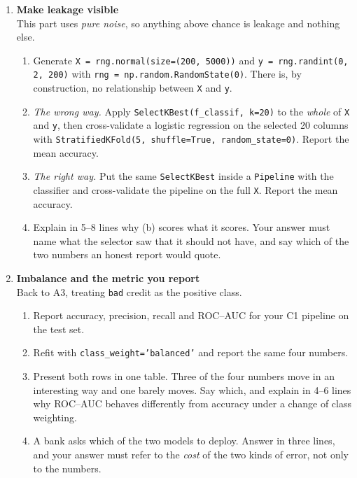 \documentclass[11pt,a4paper]{article}
\begin{document}
\begin{enumerate}[label=\textbf{C\arabic*.}, leftmargin=*]
  \item \textbf{Make leakage visible} \\
    This part uses \emph{pure noise}, so anything above chance is leakage and
    nothing else.
    \begin{enumerate}[label=(\alph*), leftmargin=*]
      \item Generate \texttt{X = rng.normal(size=(200, 5000))} and
        \texttt{y = rng.randint(0, 2, 200)} with
        \texttt{rng = np.random.RandomState(0)}. There is, by construction, no
        relationship between \texttt{X} and \texttt{y}.
      \item \emph{The wrong way.} Apply \texttt{SelectKBest(f\_classif, k=20)}
        to the \emph{whole} of \texttt{X} and \texttt{y}, then cross-validate a
        logistic regression on the selected 20 columns with
        \texttt{StratifiedKFold(5, shuffle=True, random\_state=0)}. Report the
        mean accuracy.
      \item \emph{The right way.} Put the same \texttt{SelectKBest} inside a
        \texttt{Pipeline} with the classifier and cross-validate the pipeline
        on the full \texttt{X}. Report the mean accuracy.
      \item Explain in 5--8 lines why (b) scores what it scores. Your answer
        must name what the selector saw that it should not have, and say which
        of the two numbers an honest report would quote.
    \end{enumerate}

  \item \textbf{Imbalance and the metric you report} \\
    Back to A3, treating \texttt{bad} credit as the positive class.
    \begin{enumerate}[label=(\alph*), leftmargin=*]
      \item Report accuracy, precision, recall and ROC--AUC for your C1
        pipeline on the test set.
      \item Refit with \texttt{class\_weight='balanced'} and report the same
        four numbers.
      \item Present both rows in one table. Three of the four numbers move in
        an interesting way and one barely moves. Say which, and explain in
        4--6 lines why ROC--AUC behaves differently from accuracy under a
        change of class weighting.
      \item A bank asks which of the two models to deploy. Answer in three
        lines, and your answer must refer to the \emph{cost} of the two kinds
        of error, not only to the numbers.
    \end{enumerate}


\end{enumerate}
\end{document}
